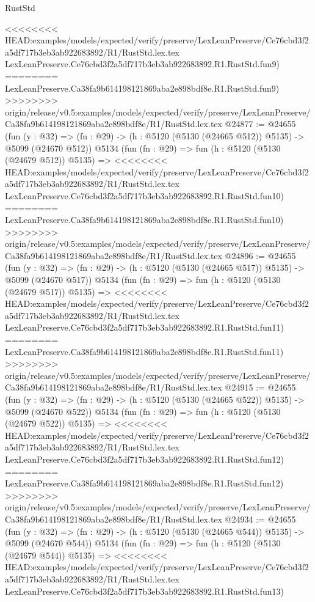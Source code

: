 \begin{lexlean}{RustStd}
\begin{coremodule}
{\begin{coremodule}
{{{{{{{{{{{{{{{{{{{{{{{{{{{{{{{<<<<<<<< HEAD:examples/models/expected/verify/preserve/LexLeanPreserve/Ce76cbd3f2a5df717b3eb3ab922683892/R1/RustStd.lex.tex
    LexLeanPreserve.Ce76cbd3f2a5df717b3eb3ab922683892.R1.RustStd.fun9)
========
    LexLeanPreserve.Ca38fa9b614198121869aba2e898bdf8e.R1.RustStd.fun9)
>>>>>>>> origin/release/v0.5:examples/models/expected/verify/preserve/LexLeanPreserve/Ca38fa9b614198121869aba2e898bdf8e/R1/RustStd.lex.tex
@24877 := @24655
    (fun (y : @32) => (fn : @29) -> (h : @5120 (@5130 (@24665 @512)) @5135) -> @5099 (@24670 @512))
    @5134
    (fun (fn : @29) =>
    fun (h : @5120 (@5130 (@24679 @512)) @5135) =>
<<<<<<<< HEAD:examples/models/expected/verify/preserve/LexLeanPreserve/Ce76cbd3f2a5df717b3eb3ab922683892/R1/RustStd.lex.tex
    LexLeanPreserve.Ce76cbd3f2a5df717b3eb3ab922683892.R1.RustStd.fun10)
========
    LexLeanPreserve.Ca38fa9b614198121869aba2e898bdf8e.R1.RustStd.fun10)
>>>>>>>> origin/release/v0.5:examples/models/expected/verify/preserve/LexLeanPreserve/Ca38fa9b614198121869aba2e898bdf8e/R1/RustStd.lex.tex
@24896 := @24655
    (fun (y : @32) => (fn : @29) -> (h : @5120 (@5130 (@24665 @517)) @5135) -> @5099 (@24670 @517))
    @5134
    (fun (fn : @29) =>
    fun (h : @5120 (@5130 (@24679 @517)) @5135) =>
<<<<<<<< HEAD:examples/models/expected/verify/preserve/LexLeanPreserve/Ce76cbd3f2a5df717b3eb3ab922683892/R1/RustStd.lex.tex
    LexLeanPreserve.Ce76cbd3f2a5df717b3eb3ab922683892.R1.RustStd.fun11)
========
    LexLeanPreserve.Ca38fa9b614198121869aba2e898bdf8e.R1.RustStd.fun11)
>>>>>>>> origin/release/v0.5:examples/models/expected/verify/preserve/LexLeanPreserve/Ca38fa9b614198121869aba2e898bdf8e/R1/RustStd.lex.tex
@24915 := @24655
    (fun (y : @32) => (fn : @29) -> (h : @5120 (@5130 (@24665 @522)) @5135) -> @5099 (@24670 @522))
    @5134
    (fun (fn : @29) =>
    fun (h : @5120 (@5130 (@24679 @522)) @5135) =>
<<<<<<<< HEAD:examples/models/expected/verify/preserve/LexLeanPreserve/Ce76cbd3f2a5df717b3eb3ab922683892/R1/RustStd.lex.tex
    LexLeanPreserve.Ce76cbd3f2a5df717b3eb3ab922683892.R1.RustStd.fun12)
========
    LexLeanPreserve.Ca38fa9b614198121869aba2e898bdf8e.R1.RustStd.fun12)
>>>>>>>> origin/release/v0.5:examples/models/expected/verify/preserve/LexLeanPreserve/Ca38fa9b614198121869aba2e898bdf8e/R1/RustStd.lex.tex
@24934 := @24655
    (fun (y : @32) => (fn : @29) -> (h : @5120 (@5130 (@24665 @544)) @5135) -> @5099 (@24670 @544))
    @5134
    (fun (fn : @29) =>
    fun (h : @5120 (@5130 (@24679 @544)) @5135) =>
<<<<<<<< HEAD:examples/models/expected/verify/preserve/LexLeanPreserve/Ce76cbd3f2a5df717b3eb3ab922683892/R1/RustStd.lex.tex
    LexLeanPreserve.Ce76cbd3f2a5df717b3eb3ab922683892.R1.RustStd.fun13)
}}}}}}}}}}}}}}}}}}}}}}}}}}}}}}}
\end{coremodule}}
\end{coremodule}
\end{lexlean}
